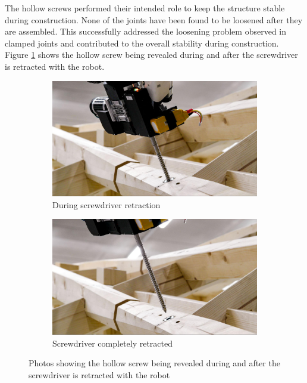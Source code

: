 The hollow screws performed their intended role to keep the structure stable during construction. None of the joints have been found to be loosened after they are assembled. This successfully addressed the loosening problem observed in clamped joints  and contributed to the overall stability during construction. Figure \ref{fig:hollow-screw-being-revealed} shows the hollow screw being revealed during and after the screwdriver is retracted with the robot.

\begin{figure}[!h]
    \centering
    \begin{subfigure}[b]{0.49\textwidth}
        \centering
        \includegraphics[width=\textwidth]{images/7b/img31.jpg}
        \caption{During screwdriver retraction}
    \end{subfigure}
    \hfill
    \begin{subfigure}[b]{0.49\textwidth}
        \centering
        \includegraphics[width=\textwidth]{images/7b/img32.jpg}
        \caption{Screwdriver completely retracted}
    \end{subfigure}
    \caption{Photos showing the hollow screw being revealed during and after the screwdriver is retracted with the robot}
    \label{fig:hollow-screw-being-revealed}
\end{figure}

